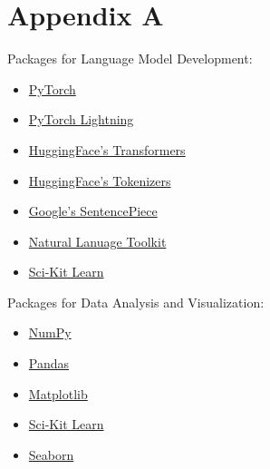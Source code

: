 \documentclass[10pt]{article}
\begin{document}
    \section{Appendix A}
        Packages for Language Model Development:
        \begin{multicols}{2}
            \begin{itemize}
                \item \href{https://pytorch.org}{PyTorch}
                \item \href{https://www.pytorchlightning.ai}{PyTorch Lightning}
                \item \href{https://github.com/huggingface/transformers}{HuggingFace's Transformers}
                \item \href{https://github.com/huggingface/tokenizers}{HuggingFace's Tokenizers}
                \item \href{https://github.com/google/sentencepiece}{Google's SentencePiece}
                \item \href{https://www.nltk.org}{Natural Lanuage Toolkit}
                \item \href{https://scikit-learn.org}{Sci-Kit Learn}
            \end{itemize}
        \end{multicols}

        Packages for Data Analysis and Visualization:
        \begin{itemize}
            \item \href{https://numpy.org}{NumPy}
            \item \href{https://pandas.pydata.org}{Pandas}
            \item \href{https://matplotlib.org}{Matplotlib}
            \item \href{https://scikit-learn.org}{Sci-Kit Learn}
            \item \href{https://seaborn.pydata.org}{Seaborn}
        \end{itemize}

    \newpage
    
    
\end{document}
